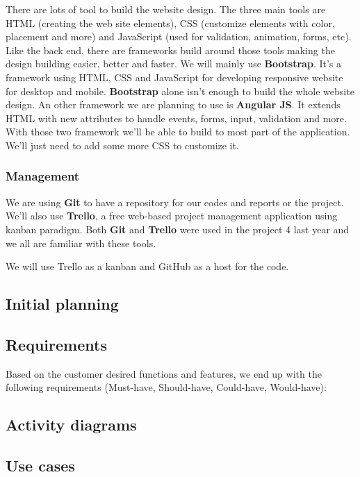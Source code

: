 There are lots of tool to build the website design. The three main tools are HTML (creating the web site elements), CSS (customize elements with color, placement and more) and JavaScript (used for validation, animation, forms, etc). Like the back end, there are frameworks build around those tools making the design building easier, better and faster. We will mainly use \textbf{Bootstrap}. It's a framework using HTML, CSS and JavaScript for developing responsive website for desktop and mobile. \textbf{Bootstrap} alone isn't enough to build the whole website design. An other framework we are planning to use is \textbf{Angular JS}. It extends HTML with new attributes to handle events, forms, input, validation and more. With those two framework we'll be able to build to most part of the application. We'll just need to add some more CSS to customize it.

\subsubsection{Management}

We are using \textbf{Git} to have a repository for our codes and reports or the project. We'll also use \textbf{Trello}, a free web-based project management application using kanban paradigm. Both \textbf{Git} and \textbf{Trello} were used in the project 4 last year and we all are familiar with these tools.

We will use Trello as a kanban and GitHub as a host for the code. \newline
\fi
\subsection{Initial planning}
\subsection{Requirements}
Based on the customer desired functions and features, we end up with the following requirements (Must-have, Should-have, Could-have, Would-have):



\subsection{Activity diagrams}
\subsection{Use cases}
